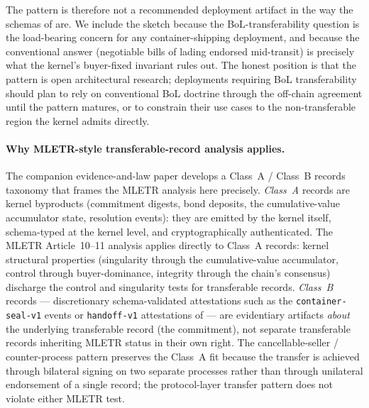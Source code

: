 \documentclass[11pt,a4paper]{article}
\theoremstyle{definition}
\theoremstyle{remark}
\begin{document}
The pattern is therefore not a recommended deployment artifact
in the way the schemas of  are. We include the
sketch because the BoL-transferability question is the
load-bearing concern for any container-shipping deployment, and
because the conventional answer (negotiable bills of lading
endorsed mid-transit) is precisely what the kernel's
buyer-fixed invariant rules out. The honest position is that
the pattern is open architectural research; deployments
requiring BoL transferability should plan to rely on conventional
BoL doctrine through the off-chain agreement until the pattern
matures, or to constrain their use cases to the
non-transferable region the kernel admits directly.

\paragraph{Why MLETR-style transferable-record analysis applies.}
The companion evidence-and-law paper develops a Class~A /
Class~B records taxonomy that frames the MLETR analysis here
precisely. \emph{Class~A} records are kernel byproducts
(commitment digests, bond deposits, the cumulative-value
accumulator state, resolution events): they are emitted by the
kernel itself, schema-typed at the kernel level, and
cryptographically authenticated. The MLETR Article~10--11
analysis applies directly to Class~A records: kernel structural
properties (singularity through the cumulative-value
accumulator, control through buyer-dominance, integrity through
the chain's consensus) discharge the control and singularity
tests for transferable records. \emph{Class~B} records ---
discretionary schema-validated attestations such as the
\texttt{container-seal-v1} events or
\texttt{handoff-v1} attestations of  ---
are evidentiary artifacts \emph{about} the underlying
transferable record (the commitment), not separate transferable
records inheriting MLETR status in their own right. The
cancellable-seller / counter-process pattern preserves the
Class~A fit because the transfer is achieved through bilateral
signing on two separate processes rather than through unilateral
endorsement of a single record; the protocol-layer transfer
pattern does not violate either MLETR test.
\end{document}
